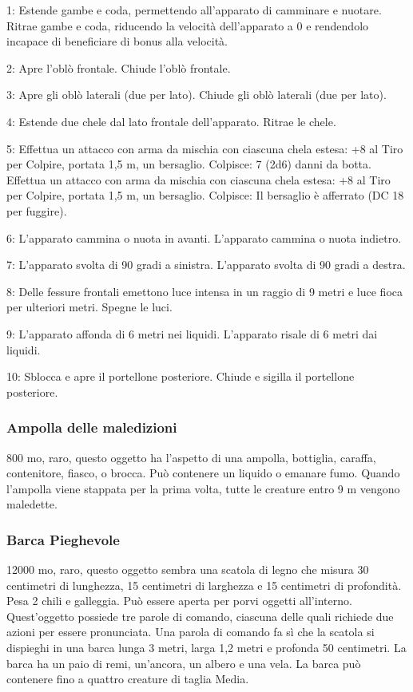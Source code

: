 \begin{multicols}{2}
	1: Estende gambe e coda, permettendo all'apparato di camminare e nuotare. Ritrae gambe e coda, riducendo la velocità dell'apparato a 0 e rendendolo incapace di beneficiare di bonus alla velocità.

	2: Apre l'oblò frontale. Chiude l'oblò frontale.

	3: Apre gli oblò laterali (due per lato). Chiude gli oblò laterali (due per lato).

	4: Estende due chele dal lato frontale dell'apparato. Ritrae le chele.

	5: Effettua un attacco con arma da mischia con ciascuna chela estesa: +8 al Tiro per Colpire, portata 1,5 m, un bersaglio. Colpisce: 7 (2d6) danni da botta. Effettua un attacco con arma da mischia con ciascuna chela estesa: +8 al Tiro per Colpire, portata 1,5 m, un bersaglio. Colpisce: Il bersaglio è afferrato (DC 18 per fuggire).

	6: L'apparato cammina o nuota in avanti. L'apparato cammina o nuota indietro.

	7: L'apparato svolta di 90 gradi a sinistra. L'apparato svolta di 90 gradi a destra.

	8: Delle fessure frontali emettono luce intensa in un raggio di 9 metri e luce fioca per ulteriori metri. Spegne le luci.

	9: L'apparato affonda di 6 metri nei liquidi. L'apparato risale di 6 metri dai liquidi.

	10: Sblocca e apre il portellone posteriore. Chiude e sigilla il portellone posteriore.


	\subsubsection*{Ampolla delle maledizioni}
	800 mo, raro, questo oggetto ha l’aspetto di una ampolla, bottiglia, caraffa, contenitore, fiasco, o brocca. Può contenere un liquido o emanare fumo. Quando l’ampolla viene stappata per la prima volta, tutte le creature entro 9 m vengono maledette.

	\subsubsection*{Barca Pieghevole}
	12000 mo, raro, questo oggetto sembra una scatola di legno che misura 30 centimetri di lunghezza, 15 centimetri di larghezza e 15 centimetri di profondità. Pesa 2 chili e galleggia. Può essere aperta per porvi oggetti all'interno. Quest'oggetto possiede tre parole di comando, ciascuna delle quali richiede due azioni per essere pronunciata. Una parola di comando fa sì che la scatola si dispieghi in una barca lunga 3 metri, larga 1,2 metri e profonda 50 centimetri. La barca ha un paio di remi, un'ancora, un albero e una vela. La barca può contenere fino a quattro creature di taglia Media.


\end{multicols}
